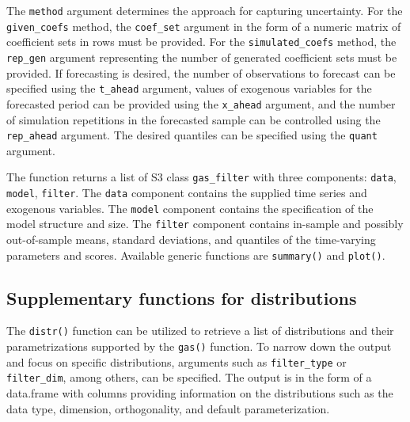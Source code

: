 The \texttt{method} argument determines the approach for capturing uncertainty. For the \texttt{given\_coefs} method, the \texttt{coef\_set} argument in the form of a numeric matrix of coefficient sets in rows must be provided. For the \texttt{simulated\_coefs} method, the \texttt{rep\_gen} argument representing the number of generated coefficient sets must be provided. If forecasting is desired, the number of observations to forecast can be specified using the \texttt{t\_ahead} argument, values of exogenous variables for the forecasted period can be provided using the \texttt{x\_ahead} argument, and the number of simulation repetitions in the forecasted sample can be controlled using the \texttt{rep\_ahead} argument. The desired quantiles can be specified using the \texttt{quant} argument.

The function returns a list of S3 class \texttt{gas\_filter} with three components: \texttt{data}, \texttt{model}, \texttt{filter}. The \texttt{data} component contains the supplied time series and exogenous variables. The \texttt{model} component contains the specification of the model structure and size. The \texttt{filter} component contains in-sample and possibly out-of-sample means, standard deviations, and quantiles of the time-varying parameters and scores. Available generic functions are \texttt{summary()} and \texttt{plot()}.

\subsection{Supplementary functions for distributions}\label{supplementary-functions-for-distributions}

The \texttt{distr()} function can be utilized to retrieve a list of distributions and their parametrizations supported by the \texttt{gas()} function. To narrow down the output and focus on specific distributions, arguments such as \texttt{filter\_type} or \texttt{filter\_dim}, among others, can be specified. The output is in the form of a data.frame with columns providing information on the distributions such as the data type, dimension, orthogonality, and default parameterization.

